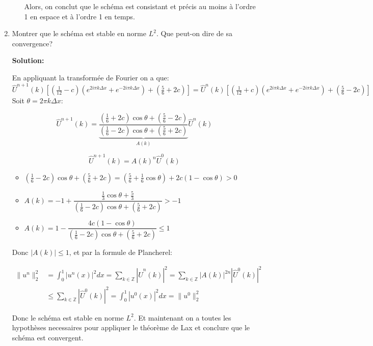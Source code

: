 \documentclass[10pt,a4paper,oneside]{article}
\begin{document}
\begin{enumerate}
\begin{itemize}
Alors, on conclut que le schéma est consistant et précis au moins à l'ordre 1 en espace et à l'ordre 1 en temps.

\end{itemize}

\item
Montrer que le schéma est stable en norme $L^2$. Que peut-on dire de sa convergence?

\textbf{Solution:}

En appliquant la transformée de Fourier on a que:\\

$\hat{U}^{n + 1}(k)[(\frac{1}{12} - c)(e^{2i\pi k\Delta x} + e^{-2i\pi k\Delta x}) + (\frac{5}{6} + 2c)] =  \hat{U}^n(k)[(\frac{1}{12} + c)(e^{2i\pi k\Delta x} + e^{-2i\pi k\Delta x}) + (\frac{5}{6} - 2c)]$\\

Soit $\theta = 2\pi k \Delta x$:

\[ \boxed{\hat{U}^{n + 1}(k) = \underbrace{\dfrac{(\frac{1}{6} + 2c) \cos\theta + (\frac{5}{6} - 2c)}{(\frac{1}{6} - 2c) \cos\theta + (\frac{5}{6} + 2c)}}_{A(k)} \hat{U}^n(k)} \]

\[ \hat{U}^{n + 1}(k) = A(k)^n \hat{U}^0(k) \]

\begin{itemize}
\item
$(\frac{1}{6} - 2c) \cos\theta + (\frac{5}{6} + 2c) = (\frac{5}{6} + \frac{1}{6} \cos\theta) + 2c(1 - \cos\theta) > 0$

\item
$A(k) = -1 + \dfrac{\frac{1}{3}\cos\theta + \frac{5}{3}}{(\frac{1}{6} - 2c) \cos\theta + (\frac{5}{6} + 2c)} > -1$

\item
$A(k) = 1 - \dfrac{4c(1 - \cos\theta)}{(\frac{1}{6} - 2c) \cos\theta + (\frac{5}{6} + 2c)} \leq 1$

\end{itemize}

Donc $|A(k)| \leq 1$, et par la formule de Plancherel:

\begin{align*}
\| u^n \|_2^2 &= \int_0^1 |u^n(x)|^2 dx = \underset{k \in \mathbb{Z}}{\sum} |\hat{U}^n(k)|^2 = \underset{k \in \mathbb{Z}}{\sum} |A(k)|^{2n} |\hat{U}^0(k)|^2 \\
&\leq \underset{k \in \mathbb{Z}}{\sum} |\hat{U}^0(k)|^2 = \int_0^1 |u^0(x)|^2 dx = \| u^0 \|_2^2
\end{align*}

Donc le schéma est stable en norme $L^2$. Et maintenant on a toutes les hypothèses necessaires pour appliquer le théorème de Lax et conclure que le schéma est convergent.


\end{enumerate}
\end{document}
